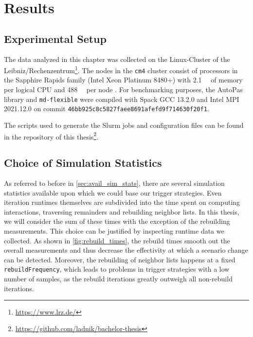 \chapter[Results]{Results}
\label{cp:results}

{
	\parindent0pt
	\textellipsis
}

\section{Experimental Setup}
The data analyzed in this chapter was collected on the Linux-Cluster of the Leibniz\-/Rechenzentrum\footnote{\href{https://www.lrz.de/}{https://www.lrz.de/}}. The nodes in the \texttt{cm4} cluster consist of processors in the Sapphire Rapids family (Intel\textsuperscript{\textregistered} Xeon\textsuperscript{\textregistered} Platinum 8480+)  with \qty{2.1}{\gibi \byte} of memory per logical CPU and \qty{488}{\gibi \byte} per node \cite{LSC2025}. For benchmarking purposes, the AutoPas library and \texttt{md-flexible} were compiled with  Spack GCC 13.2.0 and Intel MPI 2021.12.0 on commit \texttt{46bb925c8c5827faee8691afefd9f714630f20f1}.

The scripts used to generate the Slurm jobs and configuration files can be found in the repository of this thesis\footnote{\href{https://github.com/ladnik/bachelor-thesis}{https://github.com/ladnik/bachelor-thesis}}.


\section{Choice of Simulation Statistics}
As referred to before in \autoref{sec:avail_sim_stats}, there are several simulation statistics available upon which we could base our trigger strategies. Even iteration runtimes themselves are subdivided into the time spent on computing interactions, traversing remainders and rebuilding neighbor lists. %
In this thesis, we will consider the sum of these times with the exception of the rebuilding measurements. This choice can be justified by inspecting runtime data we collected. As shown in \autoref{fig:rebuild_times}, the rebuild times smooth out the overall measurements and thus decrease the effectivity at which a scenario change can be detected.
Moreover, the rebuilding of neighbor lists happens at a fixed \texttt{rebuildFrequency}, which leads to problems in trigger strategies with a low number of samples, as the rebuild iterations greatly outweigh all non-rebuild iterations.

